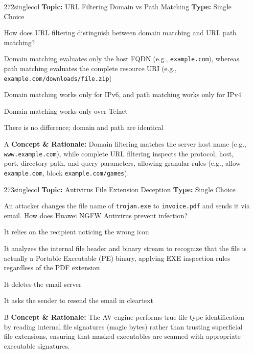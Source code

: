 \begin{qcard}{272}{singlecol}
\textcolor{darkslate!75}{\small\textbf{Topic:} URL Filtering Domain vs Path Matching \hfill \textbf{Type:} Single Choice}\vspace{0.4em}\par
How does URL filtering distinguish between domain matching and URL path matching?
\begin{qoptions}
\item Domain matching evaluates only the host FQDN (e.g., \texttt{example.com}), whereas path matching evaluates the complete resource URI (e.g., \texttt{example.com/downloads/file.zip})
\item Domain matching works only for IPv6, and path matching works only for IPv4
\item Domain matching works only over Telnet
\item There is no difference; domain and path are identical
\end{qoptions}
\end{qcard}
\nopagebreak
\begin{explainbox}{A}
\textbf{Concept \& Rationale:} Domain filtering matches the server host name (e.g., \texttt{www.example.com}), while complete URL filtering inspects the protocol, host, port, directory path, and query parameters, allowing granular rules (e.g., allow \texttt{example.com}, block \texttt{example.com/games}).
\end{explainbox}

\begin{qcard}{273}{singlecol}
\textcolor{darkslate!75}{\small\textbf{Topic:} Antivirus File Extension Deception \hfill \textbf{Type:} Single Choice}\vspace{0.4em}\par
An attacker changes the file name of \texttt{trojan.exe} to \texttt{invoice.pdf} and sends it via email. How does Huawei NGFW Antivirus prevent infection?
\begin{qoptions}
\item It relies on the recipient noticing the wrong icon
\item It analyzes the internal file header and binary stream to recognize that the file is actually a Portable Executable (PE) binary, applying EXE inspection rules regardless of the PDF extension
\item It deletes the email server
\item It asks the sender to resend the email in cleartext
\end{qoptions}
\end{qcard}
\nopagebreak
\begin{explainbox}{B}
\textbf{Concept \& Rationale:} The AV engine performs true file type identification by reading internal file signatures (magic bytes) rather than trusting superficial file extensions, ensuring that masked executables are scanned with appropriate executable signatures.
\end{explainbox}

